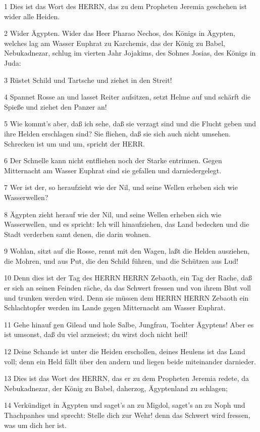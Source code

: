 \par 1 Dies ist das Wort des HERRN, das zu dem Propheten Jeremia geschehen ist wider alle Heiden.
\par 2 Wider Ägypten. Wider das Heer Pharao Nechos, des Königs in Ägypten, welches lag am Wasser Euphrat zu Karchemis, das der König zu Babel, Nebukadnezar, schlug im vierten Jahr Jojakims, des Sohnes Josias, des Königs in Juda:
\par 3 Rüstet Schild und Tartsche und ziehet in den Streit!
\par 4 Spannet Rosse an und lasset Reiter aufsitzen, setzt Helme auf und schärft die Spieße und ziehet den Panzer an!
\par 5 Wie kommt's aber, daß ich sehe, daß sie verzagt sind und die Flucht geben und ihre Helden erschlagen sind? Sie fliehen, daß sie sich auch nicht umsehen. Schrecken ist um und um, spricht der HERR.
\par 6 Der Schnelle kann nicht entfliehen noch der Starke entrinnen. Gegen Mitternacht am Wasser Euphrat sind sie gefallen und darniedergelegt.
\par 7 Wer ist der, so heraufzieht wie der Nil, und seine Wellen erheben sich wie Wasserwellen?
\par 8 Ägypten zieht herauf wie der Nil, und seine Wellen erheben sich wie Wasserwellen, und es spricht: Ich will hinaufziehen, das Land bedecken und die Stadt verderben samt denen, die darin wohnen.
\par 9 Wohlan, sitzt auf die Rosse, rennt mit den Wagen, laßt die Helden ausziehen, die Mohren, und aus Put, die den Schild führen, und die Schützen aus Lud!
\par 10 Denn dies ist der Tag des HERRN HERRN Zebaoth, ein Tag der Rache, daß er sich an seinen Feinden räche, da das Schwert fressen und von ihrem Blut voll und trunken werden wird. Denn sie müssen dem HERRN HERRN Zebaoth ein Schlachtopfer werden im Lande gegen Mitternacht am Wasser Euphrat.
\par 11 Gehe hinauf gen Gilead und hole Salbe, Jungfrau, Tochter Ägyptens! Aber es ist umsonst, daß du viel arzneiest; du wirst doch nicht heil!
\par 12 Deine Schande ist unter die Heiden erschollen, deines Heulens ist das Land voll; denn ein Held fällt über den andern und liegen beide miteinander darnieder.
\par 13 Dies ist das Wort des HERRN, das er zu dem Propheten Jeremia redete, da Nebukadnezar, der König zu Babel, daherzog, Ägyptenland zu schlagen;
\par 14 Verkündiget in Ägypten und saget's an zu Migdol, saget's an zu Noph und Thachpanhes und sprecht: Stelle dich zur Wehr! denn das Schwert wird fressen, was um dich her ist.
